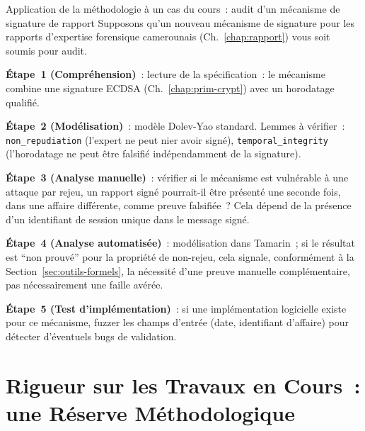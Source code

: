 \begin{boxscenario}{Application de la méthodologie à un cas du cours~:
audit d'un mécanisme de signature de rapport}
Supposons qu'un nouveau mécanisme de signature pour les rapports
d'expertise forensique camerounais (Ch.~\ref{chap:rapport}) vous
soit soumis pour audit.

\textbf{Étape~1 (Compréhension)}~: lecture de la spécification~:
le mécanisme combine une signature ECDSA (Ch.~\ref{chap:prim-crypt})
avec un horodatage qualifié.

\textbf{Étape~2 (Modélisation)}~: modèle Dolev-Yao standard.
Lemmes à vérifier~: \texttt{non\_repudiation} (l'expert ne peut nier
avoir signé), \texttt{temporal\_integrity} (l'horodatage ne peut
être falsifié indépendamment de la signature).

\textbf{Étape~3 (Analyse manuelle)}~: vérifier si le mécanisme est
vulnérable à une attaque par rejeu, un rapport signé pourrait-il
être présenté une seconde fois, dans une affaire différente, comme
preuve falsifiée~? Cela dépend de la présence d'un identifiant de
session unique dans le message signé.

\textbf{Étape~4 (Analyse automatisée)}~: modélisation dans
Tamarin~; si le résultat est ``non prouvé'' pour la propriété de
non-rejeu, cela signale, conformément à la
Section~\ref{sec:outils-formels}, la nécessité d'une preuve
manuelle complémentaire, pas nécessairement une faille avérée.

\textbf{Étape~5 (Test d'implémentation)}~: si une implémentation
logicielle existe pour ce mécanisme, fuzzer les champs d'entrée
(date, identifiant d'affaire) pour détecter d'éventuels bugs de
validation.
\end{boxscenario}

\section{Rigueur sur les Travaux en Cours~: une Réserve Méthodologique}
\label{sec:reserve-zk-nr}

